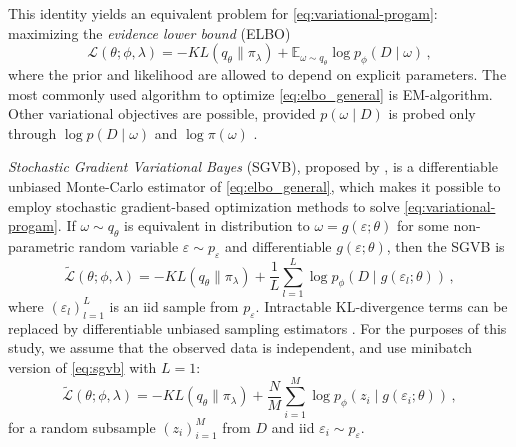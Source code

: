 \documentclass[a4paper,10pt]{article}
\newcommand{\important}[1]{\textbf{\!\colorbox{red}{#1}\!}}
\newcommand{\todo}[1]{{\color{blue} [TODO]} \important{#1}}
\begin{document}
This identity yields an equivalent problem for \eqref{eq:variational-progam}:
maximizing the \textit{evidence lower bound} (ELBO)
\begin{equation}  \label{eq:elbo_general}
  \mathcal{L}(\theta; \phi, \lambda)
    = - KL(q_{\theta} \| \pi_{\lambda})
      + \mathbb{E}_{\omega \sim q_{\theta}}
        \log p_{\phi}(D \mid \omega)
  \,,
\end{equation}
where the prior and likelihood are allowed to depend on explicit parameters. The most
commonly used algorithm to optimize \eqref{eq:elbo_general} is EM-algorithm. Other
variational objectives are possible, provided $p(\omega \mid D)$ is probed only through
$\log p(D \mid \omega)$ and $\log \pi(\omega)$ \citep{ranganath_operator_2018}.

\textit{Stochastic Gradient Variational Bayes} (SGVB), proposed by \citet{kingma_auto-encoding_2014},
is a differentiable unbiased Monte-Carlo estimator of \eqref{eq:elbo_general}, which
makes it possible to employ stochastic gradient-based optimization methods to solve
\eqref{eq:variational-progam}. If $
  \omega \sim q_{\theta}
$ is equivalent in distribution to $
  \omega = g(\varepsilon; \theta)
$ for some non-parametric random variable $
    \varepsilon \sim p_\varepsilon
$ and differentiable $
  g(\varepsilon; \theta)
$, then the SGVB is
\begin{equation}  \label{eq:sgvb}
  \widetilde{\mathcal{L}}(\theta; \phi, \lambda)
    = - KL(q_{\theta} \| \pi_{\lambda})
      + \frac1{L} \sum_{l=1}^L
        \log p_{\phi}(D \mid g(\varepsilon_{l}; \theta))
    \,, 
\end{equation}
where $
  (\varepsilon_{l})_{l=1}^L
$ is an iid sample from $p_\varepsilon$. Intractable KL-divergence terms can be replaced
by differentiable unbiased sampling estimators \citep{kingma_auto-encoding_2014}.
%
For the purposes of this study, we assume that the observed data is independent, and
use minibatch version of \eqref{eq:sgvb} with $L=1$:
\begin{equation}  \label{eq:elbo}
  \widetilde{\mathcal{L}}(\theta; \phi, \lambda)
    = - KL(q_{\theta} \| \pi_{\lambda})
      + \frac{N}{M} \sum_{i=1}^M
        \log p_{\phi}(z_i \mid g(\varepsilon_i; \theta))
    \,,
\end{equation}
for a random subsample $(z_i)_{i=1}^M$ from $D$ and iid $\varepsilon_i \sim p_\varepsilon$.
%
\end{document}
